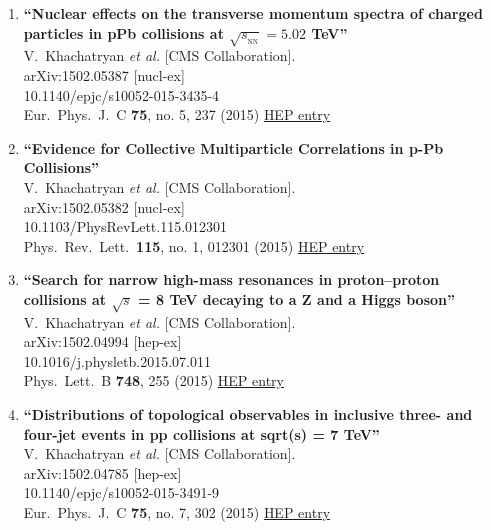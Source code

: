 \documentclass{article}
\begin{document}
\begin{enumerate}
\item%
{\bf ``Nuclear effects on the transverse momentum spectra of charged particles in pPb collisions at $\sqrt{s_{_\mathrm {NN}}} =5.02$ TeV''}
  \\{}V.~Khachatryan {\it et al.} [CMS Collaboration].
  \\{}arXiv:1502.05387 [nucl-ex]
    \\{}10.1140/epjc/s10052-015-3435-4
\\{}Eur.\ Phys.\ J.\ C {\bf 75}, no. 5, 237 (2015) %
\href{http://inspirehep.net/record/1345263}{HEP entry}


\item%
{\bf ``Evidence for Collective Multiparticle Correlations in p-Pb Collisions''}
  \\{}V.~Khachatryan {\it et al.} [CMS Collaboration].
  \\{}arXiv:1502.05382 [nucl-ex]
    \\{}10.1103/PhysRevLett.115.012301
\\{}Phys.\ Rev.\ Lett.\  {\bf 115}, no. 1, 012301 (2015) %
\href{http://inspirehep.net/record/1345262}{HEP entry}


\item%
{\bf ``Search for narrow high-mass resonances in proton–proton collisions at $\sqrt{s}$ = 8 TeV decaying to a Z and a Higgs boson''}
  \\{}V.~Khachatryan {\it et al.} [CMS Collaboration].
  \\{}arXiv:1502.04994 [hep-ex]
    \\{}10.1016/j.physletb.2015.07.011
\\{}Phys.\ Lett.\ B {\bf 748}, 255 (2015) %
\href{http://inspirehep.net/record/1345160}{HEP entry}


\item%
{\bf ``Distributions of topological observables in inclusive three- and four-jet events in pp collisions at sqrt(s) = 7 TeV''}
  \\{}V.~Khachatryan {\it et al.} [CMS Collaboration].
  \\{}arXiv:1502.04785 [hep-ex]
    \\{}10.1140/epjc/s10052-015-3491-9
\\{}Eur.\ Phys.\ J.\ C {\bf 75}, no. 7, 302 (2015) %
\href{http://inspirehep.net/record/1345159}{HEP entry}



\end{enumerate}
\end{document}
